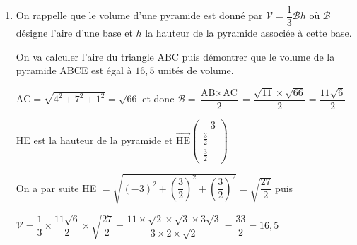 \documentclass[10pt]{article}
\providecommand{\vect}[1]{\overrightarrow{#1}}
\begin{document}
\begin{enumerate}
\begin{enumerate}
		\item On démontre que le projeté orthogonal H  du point E sur le plan (ABC) a pour coordonnées $\left(4~;~\dfrac{1}{2}~;~\dfrac{5}{2}\right)$.
		
		H correspond à l'intersection du plan (ABC) avec la droite perpendiculaire à (ABC) qui passe par E soit la droite $\mathcal{D}$, les coordonnées de H seront donc solutions du système suivant  :
		
\begin{align*}
\begin{cases} x=1+2t\\y=2-t\\z=4-t\\2x-y-z-5=0\end{cases}& \iff\begin{cases} x=1+2t\\y=2-t\\z=4-t\\2(1+2t)-(2-t)-(4-t)-5=0\end{cases} \\
&\iff \begin{cases} x=1+2t\\y=2-t\\z=4-t\\6t-9=0\end{cases} 
&\iff \begin{cases} t=\frac{3}{2}\\x=4\\y = \frac{1}{2}\\z=\frac{5}{2}\end{cases}
\end{align*}
	\end{enumerate}
\item On rappelle que le volume d'une pyramide est donné par $\mathcal{V} = \dfrac13 \mathcal{B}h$ où $\mathcal{B}$ désigne l'aire d'une base et $h$  la hauteur de la pyramide associée à cette base.

On va calculer l'aire du triangle ABC puis démontrer que le volume de la pyramide  ABCE est égal à $16,5$ unités de volume.

$\text{AC}=\sqrt{4^2+7^2+1^2}=\sqrt{66}$ et donc $\mathscr{B}=\dfrac{\text{AB}\times \text{AC}}{2} = \dfrac{\sqrt{11}\times \sqrt{66}}{2}=\dfrac{11\sqrt{6}}{2}$

HE est la hauteur de la pyramide et $\vect{\text{HE}}\begin{pmatrix}-3\\\frac{3}{2}\\\frac{3}{2} \end{pmatrix}$

On a par suite HE $=\sqrt{(-3)^2+\left(\dfrac{3}{2}\right)^2+\left(\dfrac{3}{2}\right)^2}=\sqrt{\dfrac{27}{2}}$ puis

$ \mathscr{V}=\dfrac{1}{3}\times \dfrac{11\sqrt{6}}{2}\times \sqrt{\dfrac{27}{2}} 
=\dfrac{11\times \sqrt{2}\times \sqrt{3}\times 3\sqrt{3}}{3\times 2 \times \sqrt{2}}
=\dfrac{33}{2}
= 16,5$ 
\end{enumerate}
\end{document}
